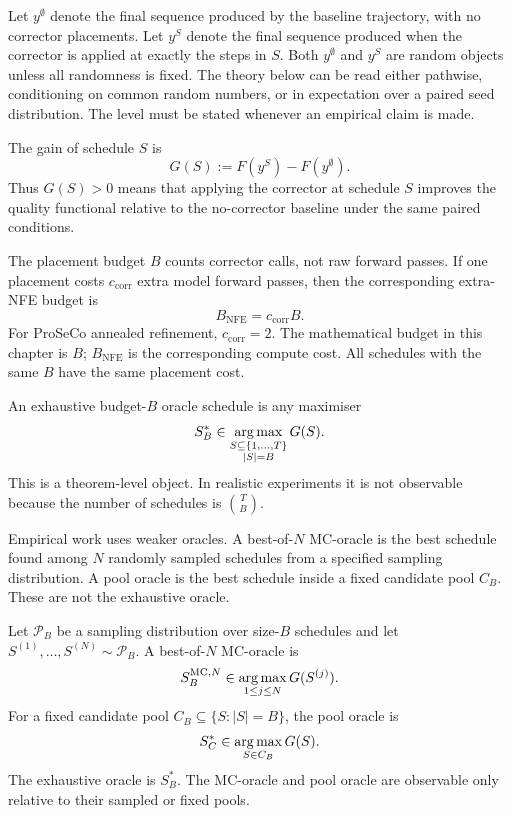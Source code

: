 Let $y^\emptyset$ denote the final sequence produced by the baseline trajectory,
with no corrector placements. Let $y^S$ denote the final sequence produced when
the corrector is applied at exactly the steps in $S$. Both $y^\emptyset$ and
$y^S$ are random objects unless all randomness is fixed. The theory below can
be read either pathwise, conditioning on common random numbers, or in
expectation over a paired seed distribution. The level must be stated whenever
an empirical claim is made.

\begin{definition}
\label{def:ch6-gain}
The gain of schedule $S$ is
\[
  G(S) := F(y^S)-F(y^\emptyset).
\]
Thus $G(S)>0$ means that applying the corrector at schedule $S$ improves the
quality functional relative to the no-corrector baseline under the same paired
conditions.
\end{definition}

The placement budget $B$ counts corrector calls, not raw forward passes. If one
placement costs $c_{\mathrm{corr}}$ extra model forward passes, then the
corresponding extra-NFE budget is
\[
  B_{\mathrm{NFE}} = c_{\mathrm{corr}} B .
\]
For ProSeCo annealed refinement, $c_{\mathrm{corr}}=2$. The mathematical budget
in this chapter is $B$; $B_{\mathrm{NFE}}$ is the corresponding compute cost.
All schedules with the same $B$ have the same placement cost.

\begin{definition}
\label{def:ch6-exhaustive-oracle}
An exhaustive budget-$B$ oracle schedule is any maximiser
\[
  S_B^* \in \operatorname*{arg\,max}_{\substack{S\subseteq \{1,\ldots,T\}\\ |S|=B}} G(S).
\]
This is a theorem-level object. In realistic experiments it is not observable
because the number of schedules is $\binom{T}{B}$.
\end{definition}

Empirical work uses weaker oracles. A best-of-$N$ MC-oracle is the best
schedule found among $N$ randomly sampled schedules from a specified sampling
distribution. A pool oracle is the best schedule inside a fixed candidate pool
$C_B$. These are not the exhaustive oracle.

\begin{definition}
\label{def:ch6-pool-oracles}
Let $\mathcal{P}_B$ be a sampling distribution over size-$B$ schedules and let
$S^{(1)},\ldots,S^{(N)} \sim \mathcal{P}_B$. A best-of-$N$ MC-oracle is
\[
  S_B^{\mathrm{MC},N}
  \in \operatorname*{arg\,max}_{1\le j\le N} G(S^{(j)}).
\]
For a fixed candidate pool $C_B \subseteq \{S: |S|=B\}$, the pool oracle is
\[
  S_C^* \in \operatorname*{arg\,max}_{S\in C_B} G(S).
\]
The exhaustive oracle is $S_B^*$. The MC-oracle and pool oracle are observable
only relative to their sampled or fixed pools.
\end{definition}

